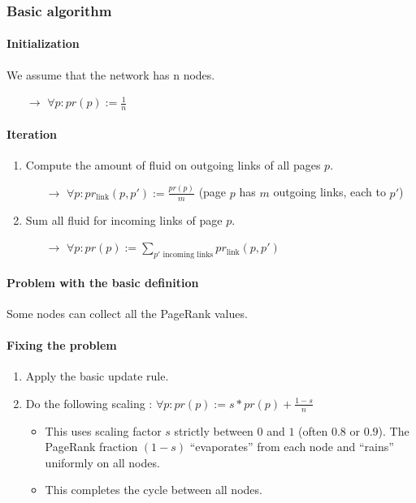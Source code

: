 \subsubsection{Basic algorithm}

\paragraph{Initialization}

We assume that the network has n nodes.
\begin{itemize}
\item[$\rightarrow$] $\forall p : pr(p) := \frac{1}{n}$
\end{itemize}

\paragraph{Iteration}

\begin{enumerate}
\item Compute the amount of fluid on outgoing links of all pages $p$.
	\begin{itemize}
	\item[$\rightarrow$] $\forall p : pr_{\text{link}}(p, p') := \frac{pr(p)}{m}$ (page $p$ has $m$ outgoing links, each to $p'$)
	\end{itemize}
\item Sum all fluid for incoming links of page $p$.
	\begin{itemize}
	\item[$\rightarrow$] $\forall p : pr(p) := \sum_{p'\text{ incoming links}} pr_{\text{link}}(p, p')$
	\end{itemize}
\end{enumerate}

\paragraph{Problem with the basic definition}

Some nodes can collect all the PageRank values.

\paragraph{Fixing the problem}

\begin{enumerate}
\item Apply the basic update rule.
\item Do the following scaling : $\forall p : pr(p) := s * pr(p) + \frac{1 - s}{n}$
	\begin{itemize}
	\item This uses scaling factor $s$ strictly between $0$ and $1$ (often $0.8$ or $0.9$). The PageRank fraction $(1-s)$ “evaporates” from each node and “rains” uniformly on all nodes.
	\item This completes the cycle between all nodes.
	\end{itemize}
\end{enumerate}

